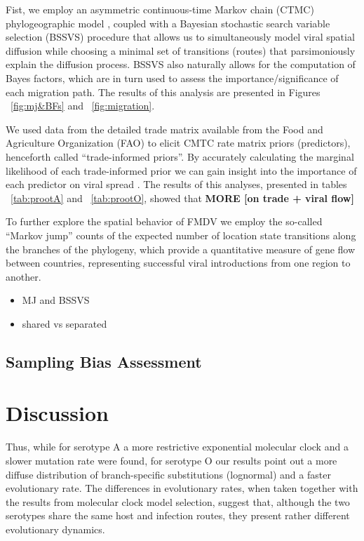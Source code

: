 \documentclass[10pt]{article}
\begin{document}
Fist, we employ an asymmetric continuous-time Markov chain (CTMC) phylogeographic model \cite{roots}, coupled with a Bayesian stochastic search variable selection (BSSVS) procedure that allows us to simultaneously model viral spatial diffusion while choosing a minimal set of transitions (routes) that parsimoniously explain the diffusion process. BSSVS also naturally allows for the computation of Bayes factors, which are in turn used to assess the importance/significance of each migration path. The results of this analysis are presented in Figures ~\ref{fig:mj&BFs} and ~\ref{fig:migration}.

We used data from the detailed trade matrix available from the Food and Agriculture Organization (FAO) to elicit CMTC rate matrix priors (predictors), henceforth called ``trade-informed priors''. By accurately calculating the marginal likelihood of each trade-informed prior we can gain insight into the importance of each predictor on viral spread \cite{Carvalho2012,Nelson2011}. The results of this analyses, presented in tables ~\ref{tab:prootA} and ~\ref{tab:prootO}, showed that  {{\bf MORE [on trade + viral flow]}}

To further explore the spatial behavior of FMDV we employ the so-called ``Markov jump'' counts \cite{Minin2008} of the expected number of location state transitions along the  branches of the phylogeny, which  provide a quantitative measure of gene flow between countries, representing successful viral introductions from one region to another.
\begin{itemize}
 \item MJ and BSSVS
 \item shared vs separated
\end{itemize}


\subsection*{Sampling Bias Assessment}

\section*{Discussion}
Thus, while for serotype A a more restrictive exponential molecular clock and a slower mutation rate were found, for serotype O our results point out a more diffuse distribution of branch-specific substitutions (lognormal) and a  faster evolutionary rate. The differences in evolutionary rates, when taken together with the results from molecular clock model selection, suggest that, although the two serotypes share the same host and infection routes, they present rather different evolutionary dynamics. 
\end{document}
